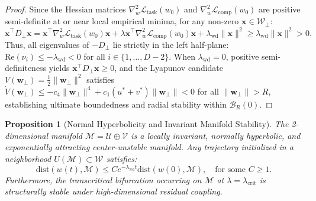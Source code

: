 \documentclass{article}
\theoremstyle{plain}
\newtheorem{proposition}{Proposition}
\theoremstyle{definition}
\begin{document}
\begin{proof}
Since the Hessian matrices $\nabla_w^2 \mathcal{L}_{\text{task}}(w_0)$ and $\nabla_w^2 \mathcal{L}_{\text{comp}}(w_0)$ are positive semi-definite at or near local empirical minima, for any non-zero $\mathbf{x} \in \mathcal{W}_\perp$:
\begin{equation}
    \mathbf{x}^\top D_\perp \mathbf{x} = \mathbf{x}^\top \nabla_w^2 \mathcal{L}_{\text{task}}(w_0) \mathbf{x} + \lambda \mathbf{x}^\top \nabla_w^2 \mathcal{L}_{\text{comp}}(w_0) \mathbf{x} + \lambda_{\text{wd}} \|\mathbf{x}\|^2 \ge \lambda_{\text{wd}} \|\mathbf{x}\|^2 > 0.
\end{equation}
Thus, all eigenvalues of $-D_\perp$ lie strictly in the left half-plane: $\text{Re}(\nu_i) \le -\lambda_{\text{wd}} < 0$ for all $i \in \{1, \dots, D-2\}$. When $\lambda_{\text{wd}} = 0$, positive semi-definiteness yields $\mathbf{x}^\top D_\perp \mathbf{x} \ge 0$, and the Lyapunov candidate $V(\mathbf{w}_\perp) = \frac{1}{2}\|\mathbf{w}_\perp\|^2$ satisfies $\dot{V}(\mathbf{w}_\perp) \le -c_4 \|\mathbf{w}_\perp\|^4 + c_1 (u^* + v^*) \|\mathbf{w}_\perp\| < 0$ for all $\|\mathbf{w}_\perp\| > R$, establishing ultimate boundedness and radial stability within $\mathcal{B}_R(0)$.
\end{proof}

\begin{proposition}[Normal Hyperbolicity and Invariant Manifold Stability]
\label{prop:normal_hyperbolicity}
The 2-dimensional manifold $\mathcal{M} = \mathcal{U} \oplus \mathcal{V}$ is a locally invariant, normally hyperbolic, and exponentially attracting center-unstable manifold. Any trajectory initialized in a neighborhood $U(\mathcal{M}) \subset \mathcal{W}$ satisfies:
\begin{equation}
    \text{dist}(w(t), \mathcal{M}) \le C e^{-\lambda_{\text{wd}} t} \text{dist}(w(0), \mathcal{M}), \quad \text{for some } C \ge 1.
\end{equation}
Furthermore, the transcritical bifurcation occurring on $\mathcal{M}$ at $\lambda = \lambda_{\text{crit}}$ is structurally stable under high-dimensional residual coupling.
\end{proposition}
\end{document}
